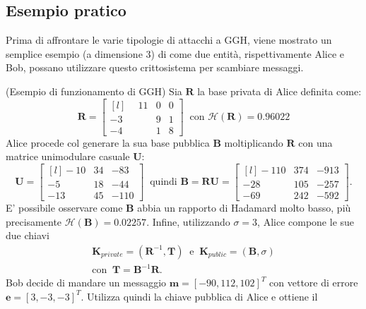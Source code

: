 \subsection{Esempio pratico}
Prima di affrontare le varie tipologie di attacchi a GGH, viene mostrato un semplice esempio
(a dimensione 3) di come due entità, rispettivamente Alice e Bob, possano utilizzare questo
crittosistema per scambiare messaggi. 
\begin{exmp} (Esempio di funzionamento di GGH)
Sia $\mathbf{R}$ la base privata di Alice definita come:
\begin{equation*}
    \mathbf{R} =
    \begin{bmatrix*}[l]
        \phantom{-}11 & 0 & 0\\
                   -3 & 9 & 1\\
                   -4 & 1 & 8
    \end{bmatrix*}
    \ \text{ con } \mathcal{H}(\mathbf{R}) = 0.96022
\end{equation*}
Alice procede col generare la sua base pubblica $\mathbf{B}$ moltiplicando $\mathbf{R}$ con una matrice
unimodulare casuale $\mathbf{U}$:
\begin{equation*}
    \mathbf{U} =
    \begin{bmatrix*}[l]
        -10 & 34 & -83\\
        -5  & 18 & -44\\
        -13 & 45 & -110
    \end{bmatrix*}
    \ \text{ quindi } \mathbf{B}=\mathbf{R}\mathbf{U} =
    \begin{bmatrix*}[l]
        -110 & 374 & -913\\
        -28  & 105 & -257\\
        -69  & 242 & -592
    \end{bmatrix*}.
\end{equation*}
E' possibile osservare come $\mathbf{B}$ abbia un rapporto di Hadamard molto basso, più 
precisamente $\mathcal{H}(\mathbf{B}) = 0.02257$. Infine, utilizzando $\sigma = 3$, 
Alice compone le sue due chiavi
\begin{gather*}
    \mathbf{K}_{private} = (\mathbf{R}^{-1}, \mathbf{T}) 
    \ \text{ e } \  
    \mathbf{K}_{public} = (\mathbf{B}, \sigma)\\
    \text{con } \ \mathbf{T} = \mathbf{B}^{-1}\mathbf{R}.
\end{gather*}
Bob decide di mandare un messaggio $\mathbf{m} = [-90, 112, 102]^T$ con vettore di errore
$\mathbf{e} = [3, -3, -3]^T$. Utilizza quindi la chiave pubblica di Alice e ottiene il 

\end{exmp}
